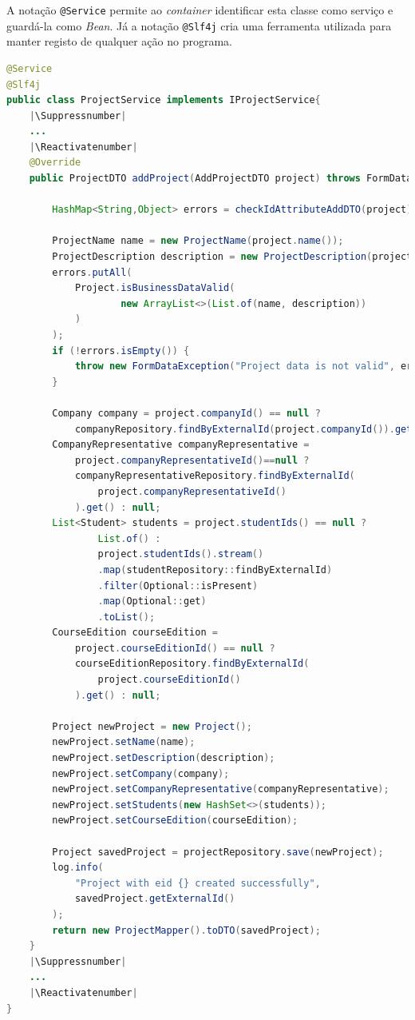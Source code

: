 A notação \lstinline|@Service| permite ao  \textit{container} identificar esta classe como serviço e guardá-la como \textit{Bean}. Já a notação \lstinline|@Slf4j| cria uma ferramenta utilizada para manter registo de qualquer ação no programa. 

\begin{lstlisting}[language=Java, caption={Implementação do metodo para criação de um novo projeto}, label={lst:method-create-new-project-class-ProjectService}]
@Service
@Slf4j
public class ProjectService implements IProjectService{
    |\Suppressnumber|
    ... 
    |\Reactivatenumber|
    @Override
    public ProjectDTO addProject(AddProjectDTO project) throws FormDataException {

        HashMap<String,Object> errors = checkIdAttributeAddDTO(project);

        ProjectName name = new ProjectName(project.name());
        ProjectDescription description = new ProjectDescription(project.description());
        errors.putAll(
            Project.isBusinessDataValid(
                    new ArrayList<>(List.of(name, description))
            )
        );
        if (!errors.isEmpty()) {
            throw new FormDataException("Project data is not valid", errors);
        }

        Company company = project.companyId() == null ? 
            companyRepository.findByExternalId(project.companyId()).get() : null;
        CompanyRepresentative companyRepresentative =
            project.companyRepresentativeId()==null ? 
            companyRepresentativeRepository.findByExternalId(
                project.companyRepresentativeId()
            ).get() : null;
        List<Student> students = project.studentIds() == null ? 
                List.of() : 
                project.studentIds().stream()
                .map(studentRepository::findByExternalId)
                .filter(Optional::isPresent)
                .map(Optional::get)
                .toList();
        CourseEdition courseEdition = 
            project.courseEditionId() == null ? 
            courseEditionRepository.findByExternalId(
                project.courseEditionId()
            ).get() : null;

        Project newProject = new Project();
        newProject.setName(name);
        newProject.setDescription(description);
        newProject.setCompany(company);
        newProject.setCompanyRepresentative(companyRepresentative);
        newProject.setStudents(new HashSet<>(students));
        newProject.setCourseEdition(courseEdition);

        Project savedProject = projectRepository.save(newProject);
        log.info(
            "Project with eid {} created successfully", 
            savedProject.getExternalId()
        );
        return new ProjectMapper().toDTO(savedProject);
    }
    |\Suppressnumber|
    ...
    |\Reactivatenumber|
}

\end{lstlisting}


